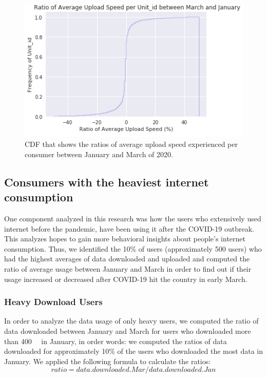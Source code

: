 \documentclass[conference,10pt]{IEEEtran}
\begin{document}
\begin{figure}
\centering
\includegraphics[width=1.0\linewidth]{figs/uploadspeed.PNG}
\caption{CDF that shows the ratios of average upload speed experienced per consumer between January and March of 2020.}
\label{fig:uploadspeed2020}
\end{figure}

\subsection{Consumers with the heaviest internet consumption}
\label{sec:analyzing-the-users-with-the-highest-internet-usage}

One component analyzed in this research was how the users who extensively used internet before the pandemic, have been using it after the COVID-19 outbreak. This analyzes hopes to gain more behavioral insights about people's internet consumption. Thus, we identified the 10\% of users (approximately 500 users) who had the highest averages of data downloaded and uploaded and computed the ratio of average usage between January and March in order to find out if their usage increased or decreased after COVID-19 hit the country in early March.

\subsubsection{Heavy Download Users}
\label{sec:heavy-download-users}

In order to analyze the data usage of only heavy users, we computed the ratio of data downloaded between January and March for users who downloaded more than \SI{400}{\giga\byte} in January, in order words: we computed the ratios of data downloaded for approximately 10\% of the users who downloaded the most data in January. We applied the following formula to calculate the ratios:
\begin{equation}
ratio= data.downloaded.Mar/ data.downloaded.Jan
\end{equation}
\end{document}
